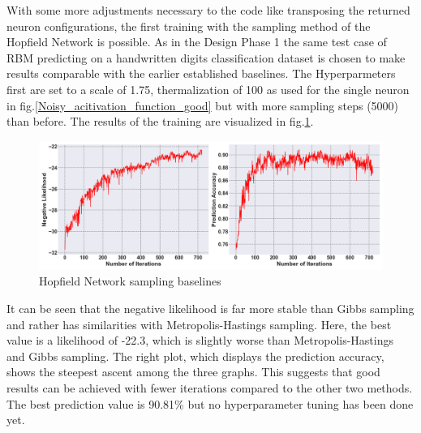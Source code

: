 With some more adjustments necessary to the code like transposing the returned neuron configurations, the first training with the sampling method of the Hopfield Network is possible. 
As in the Design Phase 1 the same test case of \ac{RBM} predicting on a handwritten digits classification dataset is chosen to make results comparable with the earlier established baselines.
The Hyperparmeters first are set to a scale of 1.75, thermalization of 100 as used for the single neuron in fig.\ref{Noisy_acitivation_function_good} but with more sampling steps (5000) than before. 
The results of the training are visualized in fig.\ref{HNN_training}.
\begin{figure}[H]
    \centering
    \includegraphics[width=1\linewidth]{graphics/HNN_combined_plot.png}
    \caption{Hopfield Network sampling baselines}
    \label{HNN_training}
\end{figure}
It can be seen that the negative likelihood is far more stable than Gibbs sampling and rather has similarities with Metropolis-Hastings sampling.
Here, the best value is a likelihood of -22.3, which is slightly worse than Metropolis-Hastings and Gibbs sampling. 
The right plot, which displays the prediction accuracy, shows the steepest ascent among the three graphs.
This suggests that good results can be achieved with fewer iterations compared to the other two methods.
The best prediction value is 90.81\% but no hyperparameter tuning has been done yet. 

